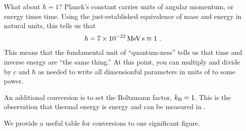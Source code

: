 \documentclass[12pt, oneside]{report}    %
\begin{document}
What about $\hbar = 1$? Planck's constant carries units of angular momentum, or energy times time. Using the just-established equivalence of mass and energy in natural units, this tells us that
\begin{align}
    \hbar &= 7 \times 10^{-22}\,\textnormal{MeV}\,\textnormal{s}  \equiv 1 \ . 
\end{align}
This means that the fundamental unit of ``quantum-ness'' tells us that time and inverse energy are ``the same thing.'' At this point, you can multiply and divide by $c$ and $\hbar$ as needed to write all dimensionful parameters in units of \GeV{} to some power. 
\begin{example}
An additional conversion is to set the Boltzmann factor, $k_\textnormal{B} =1$. This is the observation that thermal energy is energy and can be measured in \GeV{}.
\end{example}
We provide a useful table for conversions to one significant figure.
\end{document}
